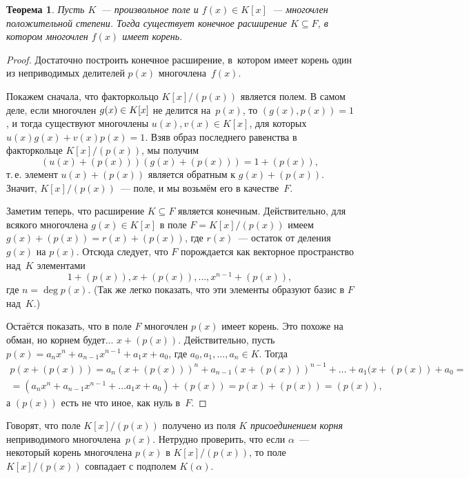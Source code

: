 \documentclass[a4paper,10pt]{amsart}
\newtheorem{theorem}{Теорема}
\theoremstyle{definition}
\theoremstyle{remark}
\begin{document}
\begin{theorem}
Пусть $K$~--- произвольное поле и $f(x)\in K[x]$~--- многочлен
положительной степени. Тогда существует конечное расширение
$K\subseteq F$, в котором многочлен $f(x)$ имеет корень.
\end{theorem}

\begin{proof}
Достаточно построить конечное расширение, в~котором имеет корень
один из неприводимых делителей $p(x)$ многочлена~$f(x)$.

Покажем сначала, что факторкольцо $K[x]/(p(x))$ является полем. В
самом деле, если многочлен $g(x) \in\nobreak K[x]$ не делится
на~$p(x)$, то $(g(x), p(x)) = 1$, и тогда существуют многочлены
$u(x), v(x) \in K[x]$, для которых $u(x) g(x) + v(x) p(x) = 1$. Взяв
образ последнего равенства в факторкольце $K[x] / (p(x))$, мы
получим
$$(u(x) + (p(x))) (g(x) + (p(x))) = 1 + (p(x)),$$ т.\,е. элемент
$u(x)+(p(x))$ является обратным к $g(x)+(p(x))$. Значит, $K[x] /
(p(x))$~--- поле, и мы возьмём его в качестве~$F$.

Заметим теперь, что расширение $K \subseteq F$ является конечным.
Действительно, для всякого многочлена $g(x) \in K[x]$ в поле $F =
K[x]/(p(x))$ имеем $g(x) + (p(x)) = r(x) + (p(x))$, где $r(x)$~---
остаток от деления $g(x)$ на $p(x)$. Отсюда следует, что $F$
порождается как векторное пространство над~$K$ элементами
$$
1 + (p(x)), x + (p(x)), \ldots, x^{n-1} + (p(x)),
$$
где $n = \deg p(x)$. (Так же легко показать, что эти элементы
образуют базис в $F$ над~$K$.)

Остаётся показать, что в поле $F$ многочлен $p(x)$ имеет корень. Это
похоже на обман, но корнем будет... $x + (p(x))$. Действительно,
пусть $p(x) = a_n x^n + a_{n-1} x^{n-1} + a_1x + a_0$, где $a_0,
a_1, \ldots, a_n \in K$. Тогда
\begin{multline*}
p(x + (p(x))) = a_n(x + (p(x)))^n + a_{n-1} (x + (p(x)))^{n-1} +
\ldots + a_1 (x + (p(x)) + a_0 =\\
= (a_nx^n + a_{n-1}x^{n-1} + \ldots a_1 x + a_0) + (p(x)) = p(x) +
(p(x)) = (p(x)),
\end{multline*}
а $(p(x))$ есть не что иное, как нуль в~$F$.
\end{proof}

Говорят, что поле $K[x] / (p(x))$ получено из поля $K$ {\it
присоединением корня} неприводимого многочлена~$p(x)$. Нетрудно
проверить, что если $\alpha$~--- некоторый корень многочлена $p(x)$
в $K[x]/(p(x))$, то поле $K[x]/(p(x))$ совпадает с подполем
$K(\alpha)$.
\end{document}
